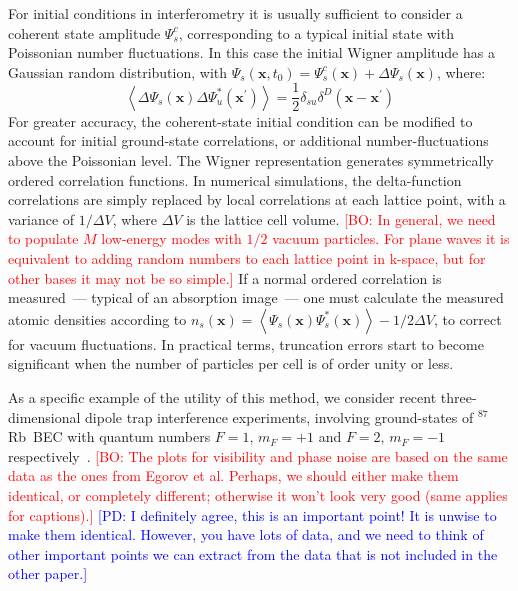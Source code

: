\documentclass[aps,prl,twocolumn,showpacs,amsmath,amssymb,superscriptaddress]{revtex4-1}
\newcommand{\bogdansremark}[1]{\textcolor{red}{{[}BO: #1{]}}}
\newcommand{\petersremark}[1]{\textcolor{blue}{{[}PD: #1{]}}}
\newcommand{\Rb}{$^{87}$Rb}
\newcommand{\bx}{\boldsymbol{x}}
\begin{document}
For initial conditions in interferometry it is usually sufficient
to consider a coherent state amplitude $\Psi_{s}^{c}$,
corresponding to a typical initial state with Poissonian number fluctuations.
In this case the initial Wigner amplitude has a Gaussian random distribution,
with $\Psi_{s}(\bx,t_{0})=\Psi_{s}^{c}(\bx)+\Delta\Psi_{s}(\bx)$,
where:
\begin{equation}
	\left\langle
		\Delta\Psi_{s}(\bx) \Delta\Psi_{u}^{*}(\bx^\prime)
	\right\rangle =
	\frac{1}{2} \delta_{su} \delta^{D} \left( \bx - \bx^\prime\right)
\end{equation}
For greater accuracy, the coherent-state initial condition
can be modified to account for initial ground-state correlations,
or additional number-fluctuations above the Poissonian level.
The Wigner representation generates symmetrically ordered correlation functions.
In numerical simulations, the delta-function correlations are simply replaced by
local correlations at each lattice point,
with a variance of $1/\Delta V$, where $\Delta V$ is the lattice cell volume.
	\bogdansremark{In general, we need to populate $M$ low-energy modes with $1/2$ vacuum particles.
	For plane waves it is equivalent to adding random numbers to each lattice point in k-space,
	but for other bases it may not be so simple.}
If a normal ordered correlation is measured~--- typical of an absorption image~---
one must calculate the measured atomic densities according to
$n_{s} \left( \bx \right) = \left\langle
	\Psi_{s}(\bx) \Psi_{s}^{*}(\bx)
\right\rangle -1/2\Delta V$,
to correct for vacuum fluctuations.
In practical terms, truncation errors start to become significant
when the number of particles per cell is of order unity or less.

As a specific example of the utility of this method,
we consider recent three-dimensional dipole trap interference experiments,
involving ground-states of \Rb~BEC with quantum numbers $F=1,\, m_{F}=+1$
and $F=2,\, m_{F}=-1$ respectively~\cite{Egorov2010}.
	\bogdansremark{The plots for visibility and phase noise are based on the same data
	as the ones from Egorov et al.
	Perhaps, we should either make them identical, or completely different;
	otherwise it won't look very good (same applies for captions).}
	\petersremark{I definitely agree, this is an important point!
	It is unwise to make them identical.
	However, you have lots of data, and we need to think of other important points
	we can extract from the data that is not included in the other paper.}
\end{document}
